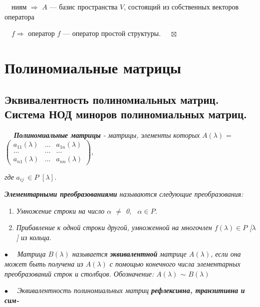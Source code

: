 \documentclass[a4paper, 12pt]{report}
\begin{document}
	$\quad$ниям $\Rightarrow$ $A$ --- базис пространства $V$, состоящий из собственных векторов оператора 
	
	$\quad f \Rightarrow$ оператор $f$ --- оператор простой структуры. $\quad \boxtimes$
	
	
	
	
	
	
	
	
	
	\chapter{Полиномиальные матрицы}
	
	\section{Эквивалентность полиномиальных матриц. Система НОД миноров полиномиальных матриц.}
	
	$\quad$ \textit{\textbf{Полиномиальные матрицы} - матрицы, элементы которых} $A(\lambda)$ = $\begin{pmatrix} a_{11}(\lambda)& \dots & a_{1n}(\lambda) \\ \dots & \dots & \dots \\ a_{n1}(\lambda) & \dots & a_{nn}(\lambda) \end{pmatrix}$, 
	
	\textit{где} $a_{ij} \ \in P$\textit{ }$[\lambda]$\textit{}.
	\par\bigskip
	\textit{ \textbf{Элементарными преобразованиями} называются следующие преобразования:}
	\begin{enumerate}
		\item  \textit{Умножение строки на число $\alpha$ $\not=$ 0, \ $\alpha \in P$.}
		
		\item  \textit{Прибавление к одной строки другой, умноженной на многочлен $f(\lambda) \in P$ [$\lambda$] из кольца}.
	\end{enumerate}
	\par\bigskip
	$\bullet$ \ \ \textit{Матрица $B(\lambda)$ называется \textbf{эквивалентной} матрице $A(\lambda)$, если она может быть получена из $A(\lambda)$ с помощью конечного числа элементарных преобразований строк и столбцов. Обозначение: $A(\lambda)$ $\sim$ $B(\lambda)$ }
	
	\par\bigskip
	$\bullet$ \ \ \textit{Эквивалентность полиномиальных матриц \textbf{рефлексивна, транзитивна и сим-}}
	
\end{document}

